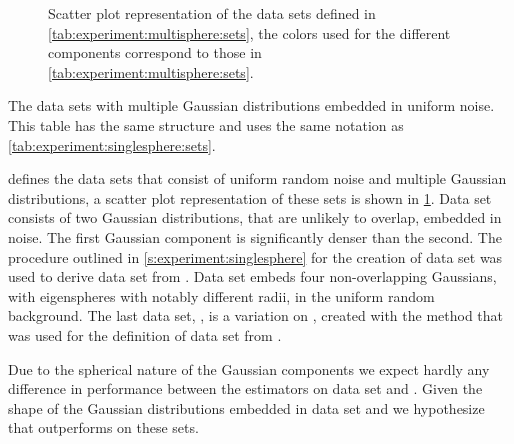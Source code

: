 
\begin{figure}
	\centering
	
	\caption{Scatter plot representation of the data sets defined in \cref{tab:experiment:multisphere:sets}, the colors used for the different components correspond to those in \cref{tab:experiment:multisphere:sets}.}
	\label{fig:experiment:multisphere:sets}
\end{figure}

\begin{table*}
	\centering
	
	\caption{The data sets with multiple Gaussian distributions embedded in uniform noise. This table has the same structure and uses the same notation as \cref{tab:experiment:singlesphere:sets}.} 	
	\label{tab:experiment:multisphere:sets}
\end{table*}

 defines the data sets that consist of uniform random noise and multiple Gaussian distributions, a scatter plot representation of these sets is shown in \cref{fig:experiment:multisphere:sets}. 
	Data set \ferdosiTwo consists of two Gaussian distributions, that are unlikely to overlap, embedded in noise. The first Gaussian component is significantly denser than the second. 
	The procedure outlined in \cref{s:experiment:singlesphere} for the creation of data set \baakmanOne was used to derive data set \baakmanTwo from \ferdosiTwo.
	Data set \ferdosiThree embeds four non-overlapping Gaussians, with eigenspheres with notably different radii, in the uniform random background. 
	The last data set, \baakmanThree, is a variation on \ferdosiThree, created with the method that was used for the definition of data set \baakmanOne from \ferdosiOne. 

	Due to the spherical nature of the Gaussian components we expect hardly any difference in performance between the estimators on data set \ferdosiTwo and \ferdosiThree. Given the shape of the Gaussian distributions embedded in data set \baakmanTwo and \baakmanThree we hypothesize that \sambe outperforms \mbe on these sets.